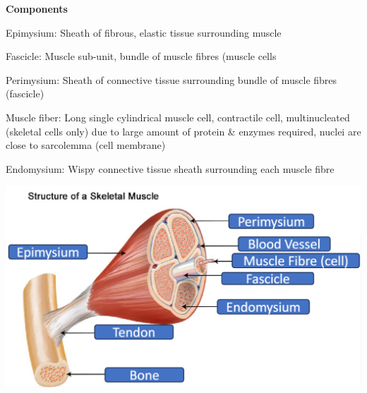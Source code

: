 \documentclass[11pt,fleqn]{book}
\begin{document}
\textbf{Components}
\begin{descriptions}
    \item[Epimysium: ]Sheath of fibrous, elastic
tissue surrounding muscle
    \item[Fascicle: ]Muscle sub-unit, bundle of muscle fibres
(muscle cells 
    \item[Perimysium: ]Sheath of connective
tissue surrounding bundle
of muscle fibres (fascicle)
    \item[Muscle fiber: ]Long single cylindrical muscle cell, contractile cell, multinucleated (skeletal
cells only) due to large
amount of protein \&
enzymes required, nuclei are close to
sarcolemma (cell
membrane)
    \item[Endomysium: ]Wispy connective tissue
sheath surrounding
each muscle fibre
\end{descriptions}
\begin{center}
    \includegraphics[width=0.65\linewidth]{Pictures/Screenshot 2024-04-03 002531.png}
\end{center}
\end{document}
